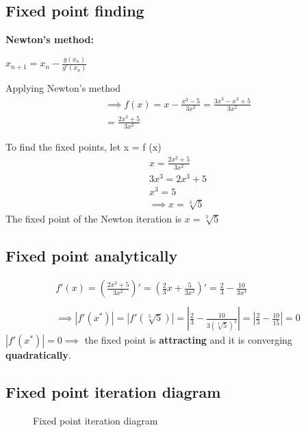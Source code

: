 \subsection{Fixed point finding}
\label{Fixed point finding}
\textbf{Newton's method:}
\begin{centering}
    $x_{n+1} = x_{n} - \frac{g(x_{n})}{g'(x_{n})}$
\end{centering}

Applying Newton's method\\
\begin{align*}
\implies f(x) = x - \frac{x^{3} - 5}{3x^{2}} = \frac{3x^{3} - x^{3} + 5}{3x^{2}}\\
= \frac{2x^{3} + 5}{3x^{2}} 
\end{align*}

To find the fixed points, let x = f (x)\\
\begin{align*}
x = \frac{2x^{3} + 5}{3x^{2}} \\
3x^{3} = 2x^{3} + 5  \\
x^{3} = 5 \\
\implies x = \sqrt[3]{5}
\end{align*}
The fixed point of the Newton iteration is $x= \sqrt[3]{5}$ \\

\subsection{Fixed point analytically}
\begin{align*}
    f'(x) = (\frac{2x^{3} + 5}{3x^{2}})'
    = (\frac{2}{3}x + \frac{5}{3x^{2}})'
    = \frac{2}{3} - \frac{10}{3x^{3}} \\
    \\
    \implies|f'(x^{*})| = |f'(\sqrt[3]{5})| = |\frac{2}{3} - \frac{10}{3(\sqrt[3]{5})^{3}}| = |\frac{2}{3} - \frac{10}{15}| = 0
\end{align*}
$|f'(x^{*})| = 0 \implies$ the fixed point is \textbf{attracting} and it is converging \textbf{quadratically}.

\subsection{Fixed point iteration diagram}
\begin{figure}[H]
\centering
{}
\caption{Fixed point iteration diagram}
\end{figure}

\newpage
